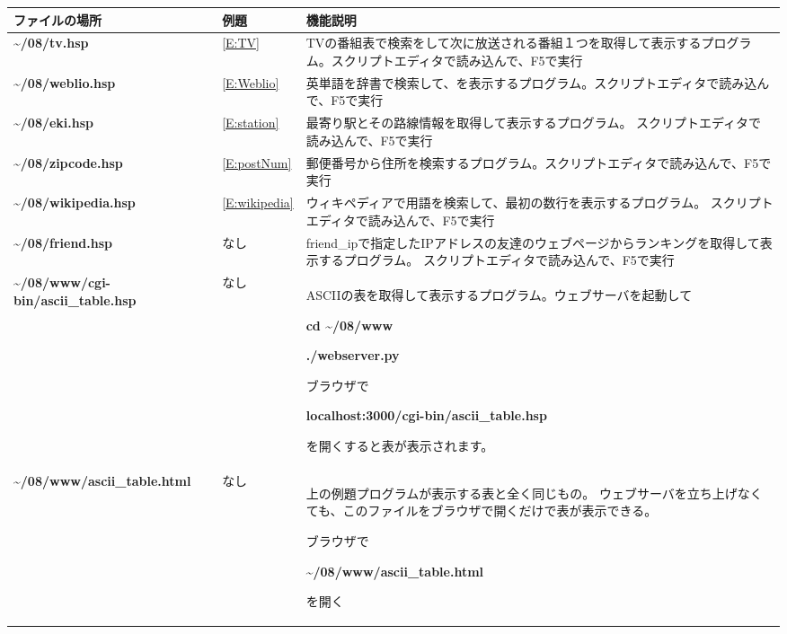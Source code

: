 \begin{flushleft}
\tablefirsthead{}
\tablehead{}
\tabletail{}
\tablelasttail{}
\begin{supertabular}{|m{6.7730002cm}|m{2.042cm}|m{7.5810003cm}|}
\hline
ファイルの場所 & 例題 & 機能説明\\\hline
\textbf{{\textasciitilde}/08/tv.hsp} & \ref*{E:TV} &
TVの番組表で検索をして次に放送される番組１つを取得して表示するプログラム。スクリプトエディタで読み込んで、F5で実行\\\hline
\textbf{{\textasciitilde}/08/weblio.hsp} & \ref*{E:Weblio} &
英単語を辞書で検索して、を表示するプログラム。スクリプトエディタで読み込んで、F5で実行\\\hline
\textbf{{\textasciitilde}/08/eki.hsp} &\ref*{E:station} &
最寄り駅とその路線情報を取得して表示するプログラム。
スクリプトエディタで読み込んで、F5で実行\\\hline
\textbf{{\textasciitilde}/08/zipcode.hsp} & \ref*{E:postNum} &
郵便番号から住所を検索するプログラム。スクリプトエディタで読み込んで、F5で実行\\\hline
\textbf{{\textasciitilde}/08/wikipedia.hsp} & \ref*{E:wikipedia} &
ウィキペディアで用語を検索して、最初の数行を表示するプログラム。
スクリプトエディタで読み込んで、F5で実行\\\hline
\textbf{{\textasciitilde}/08/friend.hsp} & なし &
friend\_ipで指定したIPアドレスの友達のウェブページからランキングを取得して表示するプログラム。
スクリプトエディタで読み込んで、F5で実行\\\hline
\textbf{{\textasciitilde}/08/www/cgi-bin/ascii\_table.hsp} & なし &
ASCIIの表を取得して表示するプログラム。ウェブサーバを起動して

	\textbf{cd {\textasciitilde}/08/www}

	\textbf{./webserver.py}

ブラウザで

	\textbf{localhost:3000/cgi-bin/ascii\_table.hsp}

を開くすると表が表示されます。\\\hline
\textbf{{\textasciitilde}/08/www/ascii\_table.html} & なし &
上の例題プログラムが表示する表と全く同じもの。
ウェブサーバを立ち上げなくても、このファイルをブラウザで開くだけで表が表示できる。

ブラウザで

	\textbf{{\textasciitilde}/08/www/ascii\_table.html}

を開く\\\hline
\end{supertabular}
\end{flushleft}

